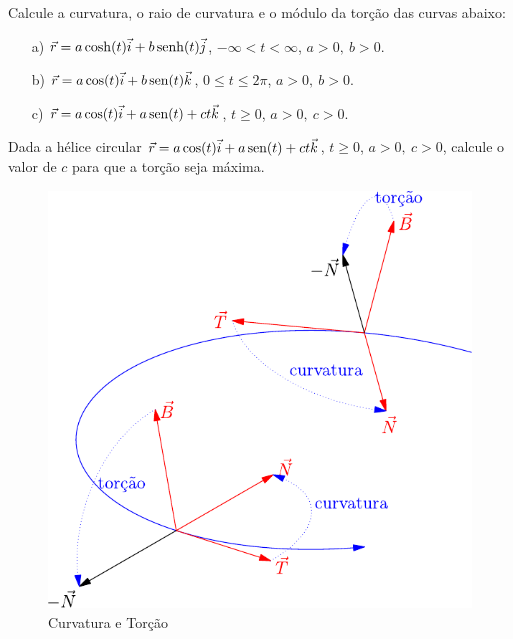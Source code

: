 \begin{exer} Calcule a curvatura, o raio de curvatura e o módulo da torção das curvas abaixo:
\begin{itemize}
\item[a)] $\vec{r}=a\cosh(t)\vec{i}+b\operatorname{senh}(t)\vec{j}$, $-\infty<t<\infty$, $a>0,\ b>0$.
\item[b)] $\vec{r}=a\cos(t)\vec{i}+b\operatorname{sen}(t)\vec{k}$, $0\leq t\leq 2\pi$, $a>0,\ b>0$.
\item[c)] $\vec{r}=a\cos(t)\vec{i}+a\operatorname{sen}(t)+ct\vec{k}$, $t\geq 0$, $a>0,\ c>0$.

\end{itemize}
\end{exer}
 
 \begin{exer}{\label{prob_torcao}} Dada a hélice circular $\vec{r}=a\cos(t)\vec{i}+a\operatorname{sen}(t)+ct\vec{k}$, $t\geq 0$, $a>0,\ c>0$, calcule o valor de $c$ para que a torção seja máxima.
 \end{exer}


 
 \begin{figure}
\begin{center}
    \includegraphics{./cap_curvas/pics/curvatura_torcao}
 \caption{Curvatura e Torção}\label{Curvatura_torcao_1}
  \end{center}
\end{figure}

